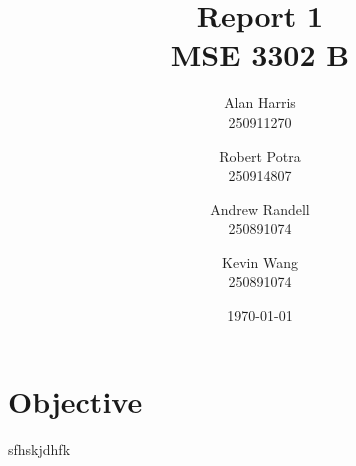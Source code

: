 \documentclass{article}
\begin{document}
\title{\textbf{Report 1\\ MSE 3302 B}}
\author{
  Alan Harris\\
  250911270
  \and
  Robert Potra\\
  250914807
  \and
  Andrew Randell\\
  250891074
  \and
  Kevin Wang\\
  250891074
}
\date{\today}
\maketitle

\tableofcontents
\thispagestyle{empty}

\pagebreak
\setcounter{page}{1}
 

 
\section{Objective}
sfhskjdhfk
\end{document}
